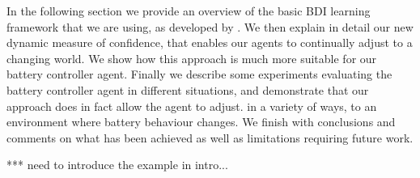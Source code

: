 In the following section we provide an overview of the basic BDI
learning framework that we are using, as developed by \cite{}. We then
explain in detail our new dynamic measure of confidence, that enables
our agents to continually adjust to a changing world. We show how this
approach is much more suitable for our battery controller
agent. Finally we describe some experiments evaluating the battery
controller agent in different situations, and demonstrate that our
approach does in fact allow the agent to adjust. in a variety of ways,
to an environment where battery behaviour changes. We finish with
conclusions and comments on what has been achieved as well as
limitations requiring future work.

*** need to introduce the example in intro...
